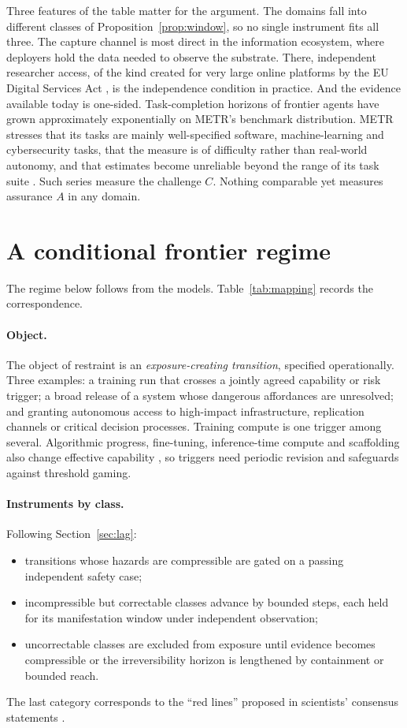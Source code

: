 \documentclass[11pt]{article}
\theoremstyle{plain}
\theoremstyle{definition}
\begin{document}
Three features of the table matter for the argument. The domains fall into different classes of Proposition~\ref{prop:window}, so no single instrument fits all three. The capture channel is most direct in the information ecosystem, where deployers hold the data needed to observe the substrate. There, independent researcher access, of the kind created for very large online platforms by the EU Digital Services Act \citep{eudsa2022}, is the independence condition in practice. And the evidence available today is one-sided. Task-completion horizons of frontier agents have grown approximately exponentially on METR's benchmark distribution. METR stresses that its tasks are mainly well-specified software, machine-learning and cybersecurity tasks, that the measure is of difficulty rather than real-world autonomy, and that estimates become unreliable beyond the range of its task suite \citep{metr2025,metr2026}. Such series measure the challenge $C$. Nothing comparable yet measures assurance $A$ in any domain.

\section{A conditional frontier regime}\label{sec:regime}

The regime below follows from the models. Table~\ref{tab:mapping} records the correspondence.

\paragraph{Object.} The object of restraint is an \emph{exposure-creating transition}, specified operationally. Three examples: a training run that crosses a jointly agreed capability or risk trigger; a broad release of a system whose dangerous affordances are unresolved; and granting autonomous access to high-impact infrastructure, replication channels or critical decision processes. Training compute is one trigger among several. Algorithmic progress, fine-tuning, inference-time compute and scaffolding also change effective capability \citep{hooker2024}, so triggers need periodic revision and safeguards against threshold gaming.

\paragraph{Instruments by class.} Following Section~\ref{sec:lag}:
\begin{itemize}[leftmargin=*]
\item transitions whose hazards are compressible are gated on a passing independent safety case;
\item incompressible but correctable classes advance by bounded steps, each held for its manifestation window under independent observation;
\item uncorrectable classes are excluded from exposure until evidence becomes compressible or the irreversibility horizon is lengthened by containment or bounded reach.
\end{itemize}
The last category corresponds to the ``red lines'' proposed in scientists' consensus statements \citep{idais2024}.
\end{document}
